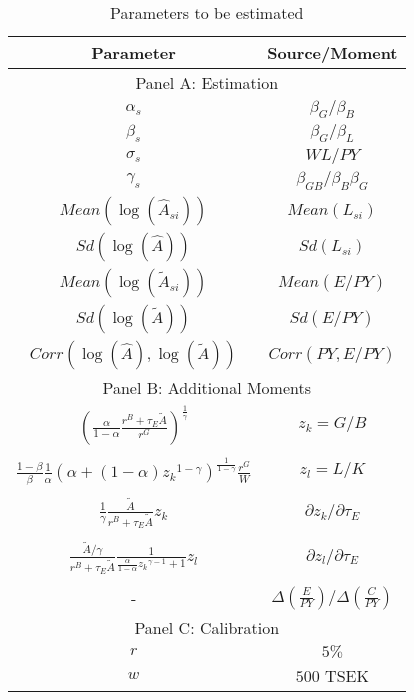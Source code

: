 \begin{table}[http]
    \centering
    \caption{\quad Parameters to be estimated} \label{tab:estimate_parameters}
    \vspace*{2mm}
    \begin{tabular}{@{}cc@{}}
    \toprule
    \textbf{Parameter}  & \textbf{Source/Moment}\\
    \midrule 
    \multicolumn{2}{c}{Panel A: Estimation} \\
    \midrule
    $\alpha_s$ & ${\beta_G}/{\beta_B}$ \\
    $\beta_s$ & ${\beta_G}/{\beta_L}$\\ 
    $\sigma_s$ & $WL/PY$\\
    $\gamma_s$ & ${\beta_{GB}}/{\beta_B\beta_G}$\\
    $Mean(\log(\hat{A}_{si})) $ & $Mean({L}_{si})$\\
    $Sd(\log({\hat{A}}))$ & $Sd({L}_{si})$\\
    $Mean(\log(\tilde{A}_{si})) $ & $Mean({E/PY})$\\
    $Sd({\log(\tilde{A})})$ & $Sd({E/PY})$\\
    $Corr(\log(\hat{A}),\log(\tilde{A}))$ & $Corr(PY,E/PY)$\\
    \midrule
    \multicolumn{2}{c}{Panel B: Additional Moments} \\
    \midrule
    $ \left(
            \frac{\alpha}{1-\alpha} \frac{r^B + {\tau_E}\tilde{A}}{r^G}
        \right) ^{\frac{1}{\gamma}}$ & $z_k= G/B$ \\\\
    $\frac{1-\beta}{\beta}\frac{1}{\alpha}\left(
        \alpha + (1-\alpha) {{z_k}}^{1-\gamma}
    \right)^{\frac{1}{1-\gamma}} \frac{r^G}{W}$ & $z_l = L/K$ \\\\
    $\frac{1}{\gamma} \frac{\tilde{A}}{r^B + \tau_E\tilde{A}} z_k$ & ${\partial z_k/\partial \tau_E }$ \\\\
    $\frac{\tilde{A}/\gamma}{r^B + \tau_E\tilde{A}}\frac{1}{\frac{\alpha}{1-\alpha}{{z_k}}^{\gamma-1} + 1}{z_l}$ &   $\partial z_l/\partial \tau_E$\\\\
    - & $\Delta(\frac{E}{PY})/\Delta(\frac{C}{PY}) $ \\
    \midrule
    \multicolumn{2}{c}{Panel C: Calibration} \\
    \midrule
    $r$ & $5\%$  \\
    $w$ & $500$ TSEK  \\
    
    \bottomrule
\end{tabular}
\end{table}





